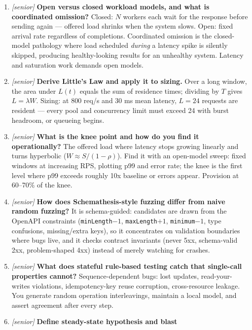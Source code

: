 \begin{enumerate}[label=\textbf{Q\arabic*.}, leftmargin=1.7cm]
        clocks) over retry budgets.
  \item \emph{[senior]} \textbf{Open versus closed workload models, and
        what is coordinated omission?} Closed: $N$ workers each wait for
        the response before sending again --- offered load shrinks when the
        system slows. Open: fixed arrival rate regardless of completions.
        Coordinated omission is the closed-model pathology where load
        scheduled \emph{during} a latency spike is silently skipped,
        producing healthy-looking results for an unhealthy system. Latency
        and saturation work demands open models.
  \item \emph{[senior]} \textbf{Derive Little's Law and apply it to
        sizing.} Over a long window, the area under $L(t)$ equals the sum
        of residence times; dividing by $T$ gives $L = \lambda W$.
        Sizing: at 800 req/s and 30 ms mean latency, $L = 24$ requests are
        resident --- every pool and concurrency limit must exceed 24 with
        burst headroom, or queueing begins.
  \item \emph{[senior]} \textbf{What is the knee point and how do you find
        it operationally?} The offered load where latency stops growing
        linearly and turns hyperbolic ($W \approx S/(1-\rho)$). Find it
        with an open-model sweep: fixed windows at increasing RPS, plotting
        p99 and error rate; the knee is the first level where p99 exceeds
        roughly 10x baseline or errors appear. Provision at 60--70\% of
        the knee.
  \item \emph{[senior]} \textbf{How does Schemathesis-style fuzzing differ
        from naive random fuzzing?} It is schema-guided: candidates are
        drawn from the OpenAPI constraints (\texttt{minLength}$-1$,
        \texttt{maxLength}$+1$, \texttt{minimum}$-1$, type confusions,
        missing/extra keys), so it concentrates on validation boundaries
        where bugs live, and it checks contract invariants (never 5xx,
        schema-valid 2xx, problem-shaped 4xx) instead of merely watching
        for crashes.
  \item \emph{[senior]} \textbf{What does stateful rule-based testing
        catch that single-call properties cannot?} Sequence-dependent
        bugs: lost updates, read-your-writes violations, idempotency-key
        reuse corruption, cross-resource leakage. You generate random
        operation interleavings, maintain a local model, and assert
        agreement after every step.
  \item \emph{[senior]} \textbf{Define steady-state hypothesis and blast
}
\end{enumerate}
